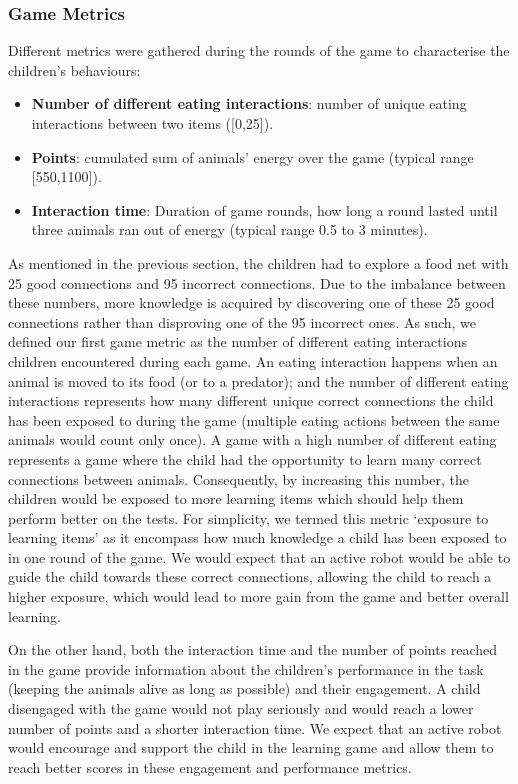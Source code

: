 \subsubsection{Game Metrics}
Different metrics were gathered during the rounds of the game to characterise the children's behaviours:
\begin{itemize}
	\item \textbf{Number of different eating interactions}: number of unique eating interactions between two items ([0,25]).
	\item \textbf{Points}: cumulated sum of animals' energy over the game (typical range [550,1100]).
	\item \textbf{Interaction time}: Duration of game rounds, how long a round lasted until three animals ran out of energy (typical range 0.5 to 3 minutes).
\end{itemize}


As mentioned in the previous section, the children had to explore a food net with 25 good connections and 95 incorrect connections. Due to the imbalance between these numbers, more knowledge is acquired by discovering one of these 25 good connections rather than disproving one of the 95 incorrect ones. As such, we defined our first game metric as the number of different eating interactions children encountered during each game. An eating interaction happens when an animal is moved to its food (or to a predator); and the number of different eating interactions represents how many different unique correct connections the child has been exposed to during the game (multiple eating actions between the same animals would count only once). A game with a high number of different eating represents a game where the child had the opportunity to learn many correct connections between animals. Consequently, by increasing this number, the children would be exposed to more learning items which should help them perform better on the tests. For simplicity, we termed this metric `exposure to learning items' as it encompass how much knowledge a child has been exposed to in one round of the game. We would expect that an active robot would be able to guide the child towards these correct connections, allowing the child to reach a higher exposure, which would lead to more gain from the game and better overall learning.

On the other hand, both the interaction time and the number of points reached in the game provide information about the children's performance in the task (keeping the animals alive as long as possible) and their engagement. A child disengaged with the game would not play seriously and would reach a lower number of points and a shorter interaction time. We expect that an active robot would encourage and support the child in the learning game and allow them to reach better scores in these engagement and performance metrics.

